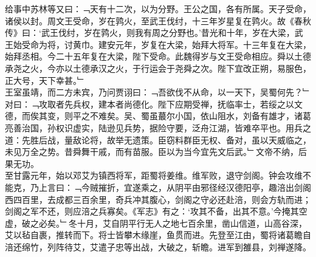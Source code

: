 {{给事中苏林等又曰：﹁天有十二次，以为分野。王公之国，各有所属。天子受命，诸侯以封。周文王受命，岁在鹑火，至武王伐纣，十三年岁星复在鹑火。故《春秋传》曰：‘武王伐纣，岁在鹑火，则我有周之分野也。’昔光和十年，岁在大梁，武王始受命为将，讨黄巾。建安元年，岁复在大梁，始拜大将军。十三年复在大梁，始拜丞相。今二十五年复在大梁，陛下受命。此魏得岁与文王受命相应。舜以土德承尧之火，今亦以土德承汉之火，于行运会于尧舜之次。陛下宜改正朔，易服色，正大号，天下幸甚。﹂}\\
王室虽靖，而二方未宾，乃问贾诩曰：﹁吾欲伐不从命，以一天下，吴蜀何先？﹂对曰：﹁攻取者先兵权，建本者尚德化。陛下应期受禅，抚临率士，若绥之以文德，而俟其变，则平之不难矣。吴、蜀虽蕞尔小国，依山阻水，刘备有雄才，诸葛亮善治国，孙权识虚实，陆逊见兵势，据险守要，泛舟江湖，皆难卒平也。用兵之道：先胜后战，量敌论将，故举无遗策。臣窃料群臣无权、备对，虽以天威临之，未见万全之势。昔舜舞干戚，而有苗服。臣以为当今宜先文后武。﹂文帝不纳，后果无功。
\\
至甘露元年，始以邓艾为镇西将军，距蜀将姜维。维军败，退守剑阁。钟会攻维不能克，乃上言曰：﹁今贼摧折，宜遂乘之，从阴平由邪径经汉德阳亭，趣涪出剑阁西四百里，去成都三百余里，奇兵冲其腹心，剑阁之守必还赴涪，则会方轨而进；剑阁之军不还，则应涪之兵寡矣。《军志》有之：‘攻其不备，出其不意。’今掩其空虚，破之必矣。﹂冬十月，艾自阴平行无人之地七百余里，凿山信道，山高谷深，艾以毡自裹，推转而下。将士皆攀木缘崖，鱼贯而进。先登至江由，蜀将诸葛瞻自涪还绵竹，列阵待艾，艾遣子忠等出战，大破之，斩瞻。进军到雒县，刘禅遂降。
}
